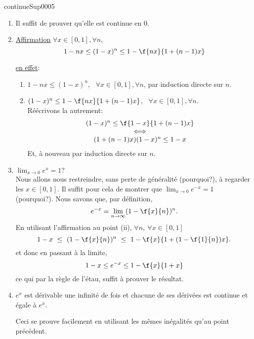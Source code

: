 
\begin{corrige}{continueSup0005}


\begin{enumerate}
\item Il suffit de prouver qu'elle est continue en $0$.
\item%
\underline{Affirmation} $\forall  x \in [0,1], \forall n$,  \[1-nx\leq(1-x)^n\leq 1 - \f{nx}{1+(n-1)x}\]

\underline{en effet}: 
\begin{enumerate}
\item $1-nx\leq(1-x)^n$, \ $\forall  x \in [0,1], \forall n$, par induction  directe sur $n$.
\item $(1-x)^n\leq 1 - \f{nx}{1+(n-1)x}$, \ $\forall  x \in [0,1], \forall n$.\\
Réécrivons la autrement: 
\[ \begin{array}{c}  (1-x)^n \leq  \f{1-x}{1+(n-1)x} \\  \iff \\ (1+(n-1)x)(1-x)^n\leq 1-x\end{array}\]
Et, à nouveau par induction directe sur $n$.

\end{enumerate}

\item $\lim_{x\rightarrow 0}e^x=1?$\\ Nous allons nous restreindre, sans perte de généralité (pourquoi?),  à regarder les $x\in [0,1]$. Il suffit pour cela de montrer que $\lim_{x\rightarrow 0}e^{-x}=1$ (pourquoi?).
Nous savons que, par définition,  \[e^{-x} = \lim_{n\rightarrow 	\infty}(1-\f{x}{n})^n.\] 
En utilisant l'affirmation au point (ii),  $\forall n, \ \forall x\in [0,1]$
\[ 1-x \  \leq \ (1-\f{x}{n})^n \ \leq \  1-\f{x}{1+(1-\f{1}{n})x}. \]
 et donc en passant à la limite,
\[1-x \leq e^{-x} \leq 1-\f{x}{1+x}\]
ce qui par la règle de l'étau, suffit à prouver le résultat. 
\item $e^x$ est dérivable une infinité de fois et chacune de ses dérivées est continue et égale à $e^x$.

Ceci se prouve  facilement en utilisant les mêmes inégalités qu'au point précédent.
\end{enumerate}

\end{corrige}
